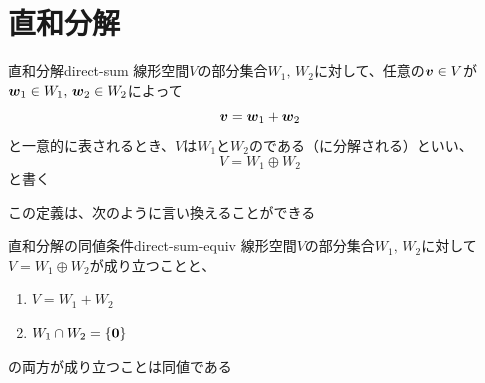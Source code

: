 \documentclass[../../../topic_linear-algebra]{subfiles}
\begin{document}
\sectionline
\section{直和分解}

\begin{mindflow}
\end{mindflow}

\begin{definition}{直和分解}{direct-sum}
  線形空間$V$の部分集合$W_1,\,W_2$に対して、任意の$\vb*{v} \in V$が$\vb*{w}_1 \in W_1, \, \vb*{w}_2 \in W_2$によって
  \begin{equation*}
    \vb*{v} = \vb*{w}_1 + \vb*{w}_2
  \end{equation*}
  と一意的に表されるとき、$V$は$W_1$と$W_2$のである（に分解される）といい、
  \begin{equation*}
    V = W_1 \oplus W_2
  \end{equation*}
  と書く
\end{definition}

この定義は、次のように言い換えることができる

\begin{theorem}{直和分解の同値条件}{direct-sum-equiv}
  線形空間$V$の部分集合$W_1,\,W_2$に対して$V=W_1 \oplus W_2$が成り立つことと、
  \begin{enumerate}[label=\romanlabel]
    \item $V = W_1 + W_2$
    \item $W_1 \cap W_2 = \{ \vb*{0} \}$
  \end{enumerate}
  の両方が成り立つことは同値である
\end{theorem}
\end{document}
